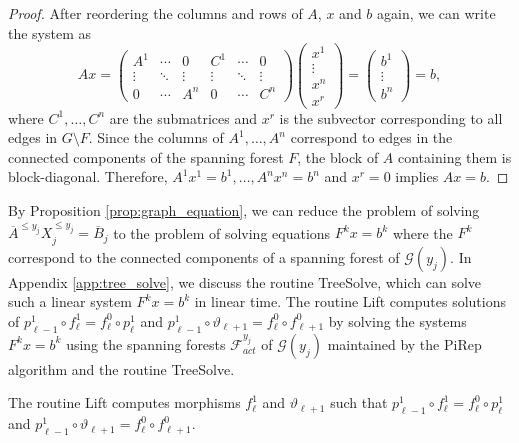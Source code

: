 \documentclass[english,a4paper,nolineno,cleveref]{socg-lipics-v2021}
\begin{document}
\begin{proof}
After reordering the columns and rows of $A$, $x$ and $b$ again, we can write the system as
\begin{equation*}
Ax=
\begin{pmatrix}
A^1 & \cdots & 0 & C^1 & \cdots & 0 \\
\vdots & \ddots & \vdots & \vdots & \ddots & \vdots \\
0 & \cdots & A^n & 0 & \cdots & C^n
\end{pmatrix}
\begin{pmatrix}
x^1 \\
\vdots \\
x^n \\
x^r
\end{pmatrix}=
\begin{pmatrix}
b^1 \\
\vdots \\
b^n 
\end{pmatrix}=b ,
\end{equation*}
where $C^1,\ldots, C^n$ are the submatrices and $x^r$ is the subvector corresponding to all edges in $G\setminus F$. Since the columns of $A^1,\ldots,A^n$ correspond to edges in the connected components of the spanning forest $F$, the block of $A$ containing them is block-diagonal. Therefore, $A^1x^1=b^1,\ldots, A^nx^n=b^n$ and $x^r=0$ implies $Ax=b$.  
\end{proof}

By Proposition \ref{prop:graph_equation}, we can reduce the problem of solving $\overline{A}^{\leq y_j}X_j^{\leq y_j}=\overline{B}_j$ to the problem of solving equations $F^kx=b^k$ where the $F^k$ correspond to the connected components of a spanning forest of $\mathcal{G}(y_j)$. In Appendix \ref{app:tree_solve}, we discuss the routine {\sc TreeSolve}, which can solve such a linear system $F^kx=b^k$ in linear time. The routine {\sc Lift} computes solutions of $p_{\ell\minus 1}^1\circ f^1_{\ell}=f^0_\ell\circ p_\ell^1$ and $p_{\ell\minus 1}^1\circ \vartheta_{\ell+1}=f^0_\ell\circ f^0 _{\ell+1}$ by solving the systems $F^kx=b^k$ using the spanning forests $\mathcal{F}^{y_j}_{act}$ of $\mathcal{G}(y_j)$ maintained by the {\sc PiRep} algorithm and the routine {\sc TreeSolve}.


\begin{theorem} \label{thm:GraphSolve_correct}
The routine {\sc Lift} computes morphisms $f^1_\ell$ and $\vartheta_{\ell+1}$ such that $p_{\ell\minus 1}^1\circ f^1_\ell=f^0_\ell\circ p_\ell^1$ and $p_{\ell\minus 1}^1\circ\vartheta_{\ell+1}=f^0_\ell\circ f^0_{\ell+1}$.   
\end{theorem}
\end{document}
